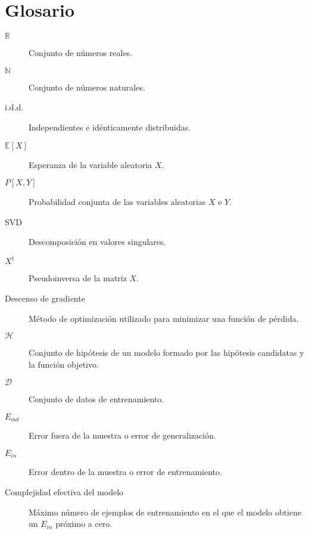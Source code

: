 
\chapter*{Glosario}

\begin{description} 
  \item[$\mathbb{R}$] Conjunto de números reales.
  \item[$\mathbb{N}$] Conjunto de números naturales.
  \item[i.d.d.] Independientes e idénticamente distribuidas.
  \item[${\mathbb{E}[X]}$] Esperanza de la variable aleatoria $X$.
  \item[${P[X, Y]}$] Probabilidad conjunta de las variables aleatorias $X$ e $Y$.
  \item[SVD] Descomposición en valores singulares.
  \item[$X^{\dagger}$] Pseudoinversa de la matriz $X$.
  \item[Descenso de gradiente] Método de optimización utilizado para minimizar una función de pérdida.
  \item[$\mathcal{H}$] Conjunto de hipótesis de un modelo formado por las hipótesis candidatas y la función objetivo.
  \item[$\mathcal{D}$] Conjunto de datos de entrenamiento.
  \item[$E_{out}$] Error fuera de la muestra o error de generalización. 
  \item[$E_{in}$] Error dentro de la muestra o error de entrenamiento.
  \item[Complejidad efectiva del modelo] Máximo número de ejemplos de entrenamiento en el que el modelo obtiene un $E_{in}$ próximo a cero.
\end{description}
\endinput
